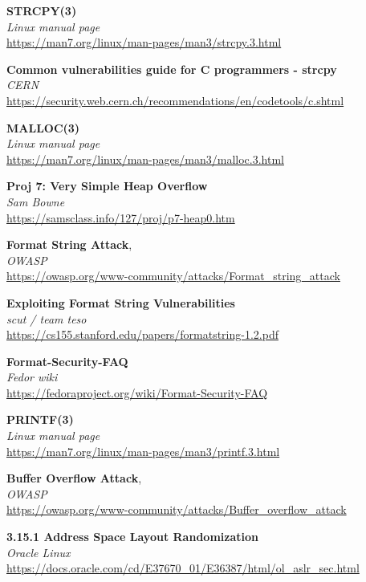 \documentclass[10pt,a4paper]{article}
\begin{document}
\begin{thebibliography}{9}

	\textbf{STRCPY(3)}\\
	\textit{Linux manual page}\\
	\url{https://man7.org/linux/man-pages/man3/strcpy.3.html}

	\textbf{Common vulnerabilities guide for C programmers - strcpy}\\
	\textit{CERN}\\
	\url{https://security.web.cern.ch/recommendations/en/codetools/c.shtml}

	\textbf{MALLOC(3)}\\
	\textit{Linux manual page}\\
	\url{https://man7.org/linux/man-pages/man3/malloc.3.html}

	\textbf{Proj 7: Very Simple Heap Overflow}\\
	\textit{Sam Bowne}\\
	\url{https://samsclass.info/127/proj/p7-heap0.htm}

	\textbf{Format String Attack}, \\
	\textit{OWASP} \\
	\url{https://owasp.org/www-community/attacks/Format_string_attack}

	\textbf{Exploiting Format String Vulnerabilities}\\
	\textit{scut / team teso}\\
	\url{https://cs155.stanford.edu/papers/formatstring-1.2.pdf}

	\textbf{Format-Security-FAQ}\\
	\textit{Fedor wiki}\\
	\url{https://fedoraproject.org/wiki/Format-Security-FAQ}
	
	\textbf{PRINTF(3)}\\
	\textit{Linux manual page}\\
	\url{https://man7.org/linux/man-pages/man3/printf.3.html}

	\textbf{Buffer Overflow Attack}, \\
	\textit{OWASP} \\
	\url{https://owasp.org/www-community/attacks/Buffer_overflow_attack}

	\textbf{3.15.1 Address Space Layout Randomization}\\
	\textit{Oracle Linux}\\
	\url{https://docs.oracle.com/cd/E37670_01/E36387/html/ol_aslr_sec.html}
	
\end{thebibliography}
\end{document}
